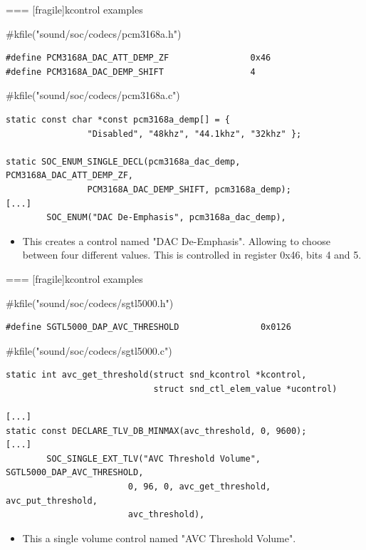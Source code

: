 === [fragile]{kcontrol examples}
  \begin{block}{#kfile("sound/soc/codecs/pcm3168a.h")}
    \fontsize{9}{9}\selectfont
    \begin{verbatim}
#define PCM3168A_DAC_ATT_DEMP_ZF                0x46
#define PCM3168A_DAC_DEMP_SHIFT                 4
    \end{verbatim}
  \end{block}
  \begin{block}{#kfile("sound/soc/codecs/pcm3168a.c")}
    \fontsize{9}{9}\selectfont
    \begin{verbatim}
static const char *const pcm3168a_demp[] = {
                "Disabled", "48khz", "44.1khz", "32khz" };

static SOC_ENUM_SINGLE_DECL(pcm3168a_dac_demp, PCM3168A_DAC_ATT_DEMP_ZF,
                PCM3168A_DAC_DEMP_SHIFT, pcm3168a_demp);
[...]
        SOC_ENUM("DAC De-Emphasis", pcm3168a_dac_demp),
    \end{verbatim}
  \end{block}
  \begin{itemize}
  \item This creates a control named "DAC De-Emphasis". Allowing to
    choose between four different values.
    This is controlled in register 0x46, bits 4 and 5.
  \end{itemize}


=== [fragile]{kcontrol examples}
  \begin{block}{#kfile("sound/soc/codecs/sgtl5000.h")}
    \fontsize{9}{9}\selectfont
    \begin{verbatim}
#define SGTL5000_DAP_AVC_THRESHOLD                0x0126
    \end{verbatim}
  \end{block}
  \begin{block}{#kfile("sound/soc/codecs/sgtl5000.c")}
    \fontsize{9}{9}\selectfont
    \begin{verbatim}
static int avc_get_threshold(struct snd_kcontrol *kcontrol,
                             struct snd_ctl_elem_value *ucontrol)

[...]
static const DECLARE_TLV_DB_MINMAX(avc_threshold, 0, 9600);
[...]
        SOC_SINGLE_EXT_TLV("AVC Threshold Volume", SGTL5000_DAP_AVC_THRESHOLD,
                        0, 96, 0, avc_get_threshold, avc_put_threshold,
                        avc_threshold),
    \end{verbatim}
  \end{block}
  \begin{itemize}
  \item This a single volume control named "AVC Threshold Volume".
  \end{itemize}


